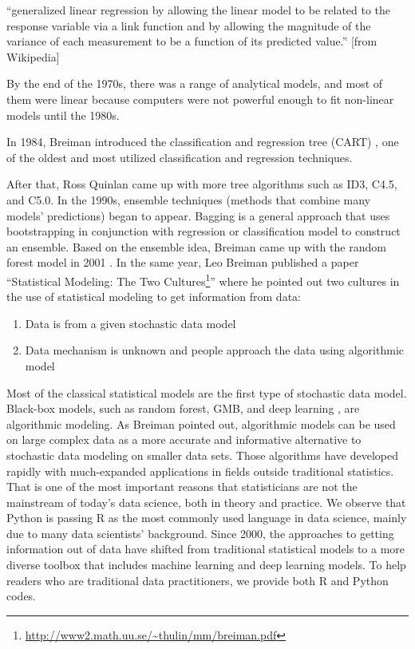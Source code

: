 \documentclass[
  12pt,
]{krantz}
\providecommand{\tightlist}{%
  \setlength{\itemsep}{0pt}\setlength{\parskip}{0pt}}
\renewenvironment{quote}{\begin{VF}}{\end{VF}}
\renewcommand{\href}[2]{#2\footnote{\url{#1}}}
\begin{document}
\begin{quote}
``generalized linear regression by allowing the linear model to be related to the response variable via a link function and by allowing the magnitude of the variance of each measurement to be a function of its predicted value.'' {[}from Wikipedia{]}
\end{quote}

By the end of the 1970s, there was a range of analytical models, and most of them were linear because computers were not powerful enough to fit non-linear models until the 1980s.

In 1984, Breiman introduced the classification and regression tree (CART)  , one of the oldest and most utilized classification and regression techniques\citep{Breiman1984}.

After that, Ross Quinlan came up with more tree algorithms such as ID3, C4.5, and C5.0. In the 1990s, ensemble techniques (methods that combine many models' predictions) began to appear. Bagging is a general approach that uses bootstrapping in conjunction with regression or classification model to construct an ensemble. Based on the ensemble idea, Breiman came up with the random forest  model in 2001 \citep{Breiman2001}. In the same year, Leo Breiman published a paper ``\href{http://www2.math.uu.se/~thulin/mm/breiman.pdf}{Statistical Modeling: The Two Cultures}'' \citep{Breiman2001TwoCulture} where he pointed out two cultures in the use of statistical modeling to get information from data:

\begin{enumerate}
\def\labelenumi{(\arabic{enumi})}
\tightlist
\item
  Data is from a given stochastic data model\\
\item
  Data mechanism is unknown and people approach the data using algorithmic model
\end{enumerate}

Most of the classical statistical models are the first type of stochastic data model. Black-box models, such as random forest, GMB, and deep learning   , are algorithmic modeling. As Breiman pointed out, algorithmic models can be used on large complex data as a more accurate and informative alternative to stochastic data modeling on smaller data sets. Those algorithms have developed rapidly with much-expanded applications in fields outside traditional statistics. That is one of the most important reasons that statisticians are not the mainstream of today's data science, both in theory and practice. We observe that Python is passing R as the most commonly used language in data science, mainly due to many data scientists' background. Since 2000, the approaches to getting information out of data have shifted from traditional statistical models to a more diverse toolbox that includes machine learning and deep learning models. To help readers who are traditional data practitioners, we provide both R and Python codes.
\end{document}
